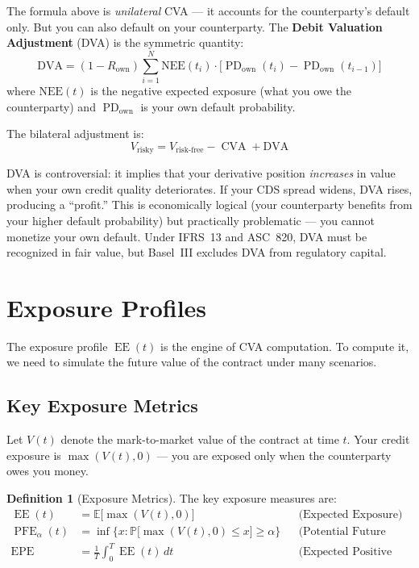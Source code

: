 \documentclass[11pt, a4paper]{article}
\theoremstyle{definition}
\newtheorem{definition}{Definition}[section]
\theoremstyle{plain}
\theoremstyle{remark}
\newcommand{\EV}{\mathbb{E}}
\newcommand{\PV}{\mathbb{P}}
\newcommand{\CVA}{\operatorname{CVA}}
\newcommand{\EE}{\operatorname{EE}}
\newcommand{\PFE}{\operatorname{PFE}}
\newcommand{\EPE}{\operatorname{EPE}}
\newcommand{\PD}{\operatorname{PD}}
\begin{document}
The formula above is \emph{unilateral} CVA --- it accounts for the counterparty's
default only.
But you can also default on your counterparty.
The \textbf{Debit Valuation Adjustment} (DVA) is the symmetric quantity:
\[
    \text{DVA} = (1 - R_{\text{own}})\sum_{i=1}^{N} \text{NEE}(t_i)\cdot
    \bigl[\PD_{\text{own}}(t_i) - \PD_{\text{own}}(t_{i-1})\bigr]
\]
where $\text{NEE}(t)$ is the negative expected exposure (what you owe the counterparty)
and $\PD_{\text{own}}$ is your own default probability.

The bilateral adjustment is:
\[
    V_{\text{risky}} = V_{\text{risk-free}} - \CVA + \text{DVA}
\]

\begin{warningbox}
DVA is controversial: it implies that your derivative position \emph{increases} in value
when your own credit quality deteriorates.
If your CDS spread widens, DVA rises, producing a ``profit.''
This is economically logical (your counterparty benefits from your higher default probability)
but practically problematic --- you cannot monetize your own default.
Under IFRS~13 and ASC~820, DVA must be recognized in fair value, but Basel~III excludes
DVA from regulatory capital.
\end{warningbox}

\section{Exposure Profiles}
\label{sec:exposure-profiles}

The exposure profile $\EE(t)$ is the engine of CVA computation.
To compute it, we need to simulate the future value of the contract under
many scenarios.

\subsection{Key Exposure Metrics}

Let $V(t)$ denote the mark-to-market value of the contract at time $t$.
Your credit exposure is $\max(V(t), 0)$ --- you are exposed only when
the counterparty owes you money.

\begin{definition}[Exposure Metrics]\label{def:exposure-metrics}
The key exposure measures are:
\begin{align}
    \EE(t) &= \EV\bigl[\max(V(t), 0)\bigr]
    && \text{(Expected Exposure)} \label{eq:ee}\\[4pt]
    \PFE_\alpha(t) &= \inf\bigl\{x : \PV\bigl[\max(V(t), 0) \leq x\bigr] \geq \alpha\bigr\}
    && \text{(Potential Future Exposure)} \label{eq:pfe}\\[4pt]
    \EPE &= \frac{1}{T}\int_0^T \EE(t)\, dt
    && \text{(Expected Positive Exposure)} \label{eq:epe}
\end{align}
\end{definition}
\end{document}
